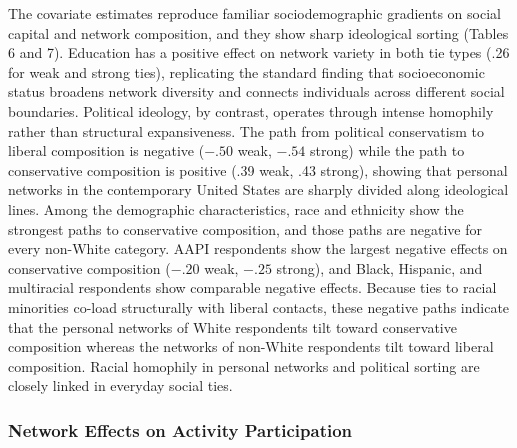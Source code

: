\documentclass[
  12pt
]{article}
\begin{document}
The covariate estimates reproduce familiar sociodemographic gradients on social capital and network composition, and they show sharp ideological sorting (Tables 6 and 7). Education has a positive effect on network variety in both tie types (.26 for weak and strong ties), replicating the standard finding that socioeconomic status broadens network diversity and connects individuals across different social boundaries. Political ideology, by contrast, operates through intense homophily rather than structural expansiveness. The path from political conservatism to liberal composition is negative ($-.50$ weak, $-.54$ strong) while the path to conservative composition is positive (.39 weak, .43 strong), showing that personal networks in the contemporary United States are sharply divided along ideological lines. Among the demographic characteristics, race and ethnicity show the strongest paths to conservative composition, and those paths are negative for every non-White category. AAPI respondents show the largest negative effects on conservative composition ($-.20$ weak, $-.25$ strong), and Black, Hispanic, and multiracial respondents show comparable negative effects. Because ties to racial minorities co-load structurally with liberal contacts, these negative paths indicate that the personal networks of White respondents tilt toward conservative composition whereas the networks of non-White respondents tilt toward liberal composition. Racial homophily in personal networks and political sorting are closely linked in everyday social ties.

\subsubsection{Network Effects on Activity Participation}\label{network-effects-on-activity-participation}
\end{document}
